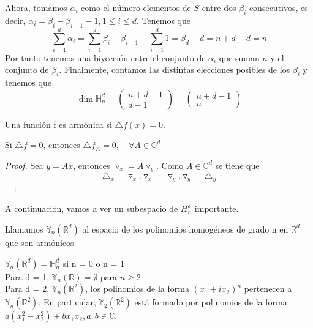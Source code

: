 Ahora, tomamos $\alpha_i$ como el número elementos de $S$ entre dos $\beta_i$ consecutivos, es decir, $ \alpha_i =  \beta_i - \beta_{i-1} - 1,  1\leq i \leq d$. Tenemos que $$
\sum_{i=1}^{d} \alpha_i = \sum_{i=1}^{d} \beta_i - \beta_{i-1} - \sum_{i=1}^{d} 1 = \beta_d - d = n+d-d = n
$$
Por tanto tenemos una biyección entre el conjunto de $\alpha_i$ que suman $n$ y el conjunto de $\beta_i$. Finalmente, contamos las distintas elecciones posibles de los $\beta_i$ y tenemos que
$$
\dim \mathds{H}^d_n = \begin{pmatrix}
n+d-1 \\
d-1
\end{pmatrix} = \begin{pmatrix}
n+d-1 \\
n
\end{pmatrix}
$$
\begin{defn}
Una función f es armónica si $\triangle f (x) = 0$. 
\end{defn}
\begin{lem}
	Si $\triangle f = 0$, entonces $\triangle f_A = 0, \quad \forall A \in \mathds{O}^d$
\end{lem}
\begin{proof}
	Sea $ y = Ax$, entonces $\triangledown_x = A \triangledown_y$. Como $ A \in \mathds{O}^d$ se tiene que 
	$$
	\triangle_x = \triangledown_x . \triangledown_x = \triangledown_y . \triangledown_y = \triangle_y
	$$ 
\end{proof}
A continuación, vamos a ver un subespacio de $H^d_n$ importante.
\begin{defn}
Llamamos $\mathds{Y}_n(\mathds{R}^d)$ al espacio de los polinomios homogéneos de grado n en $\mathds{R}^d$ que son armónicos.
\end{defn}
\begin{example}
$\mathds{Y}_n(\mathds{R}^d) = \mathds{H}^d_n$ si n = 0 o n = 1\\
Para d = 1, $\mathds{Y}_n(\mathds{R})=\emptyset$ para $n\ge 2$\\
Para d = 2, $\mathds{Y}_n(\mathds{R}^2)$, los polinomios de la forma $(x_1 + ix_2) ^n$ pertenecen a $\mathds{Y}_n(\mathds{R}^2).$ En particular,  $\mathds{Y}_2(\mathds{R}^2)$ está formado por polinomios de la forma $a(x_1^2-x_2^2)+bx_1x_2, a,b\in\mathds{C}$.
\end{example} 
